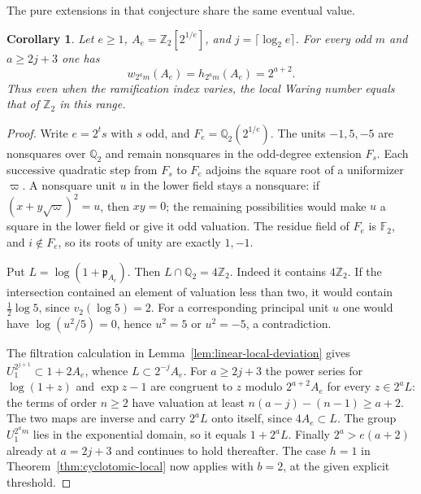 \documentclass[11pt,letterpaper]{article}
\newtheorem{corollary}[corollary]{Corollary}
\theoremstyle{definition}
\numberwithin{equation}{section}
\begin{document}
The pure extensions in that conjecture share the same eventual value.
\begin{corollary}\label{cor:pure-dyadic-width}
Let $e\ge1$, $A_e=\mathbb Z_2[2^{1/e}]$, and $j=\lceil\log_2 e\rceil$.
For every odd $m$ and $a\ge2j+3$ one has
\[
          w_{2^a m}(A_e)=h_{2^a m}(A_e)=2^{a+2}.
\]
Thus even when the ramification index varies, the local Waring number
equals that of $\mathbb Z_2$ in this range.
\end{corollary}
\begin{proof}
Write $e=2^t s$ with $s$ odd, and $F_e=\mathbb Q_2(2^{1/e})$.
The units $-1,5,-5$ are nonsquares over $\mathbb Q_2$ and remain
nonsquares in the odd-degree extension $F_s$. Each successive
quadratic step from $F_s$ to $F_e$ adjoins the square root of a
uniformizer $\varpi$. A nonsquare unit $u$ in the lower field stays
a nonsquare: if $(x+y\sqrt\varpi)^2=u$, then $xy=0$; the remaining
possibilities would make $u$ a square in the lower field or give
it odd valuation. The residue field of $F_e$ is $\mathbb F_2$, and
$i\notin F_e$, so its roots of unity are exactly $1,-1$.

Put $L=\log(1+\mathfrak p_{A_e})$. Then
$L\cap\mathbb Q_2=4\mathbb Z_2$. Indeed it contains $4\mathbb Z_2$.
If the intersection contained an element of valuation less than
two, it would contain $\frac12\log 5$, since $v_2(\log 5)=2$.
For a corresponding principal unit $u$ one would have
$\log(u^2/5)=0$, hence $u^2=5$ or $u^2=-5$, a contradiction.

The filtration calculation in Lemma~\ref{lem:linear-local-deviation}
gives $U_1^{2^{j+1}}\subset1+2A_e$, whence $L\subset2^{-j}A_e$.
For $a\ge2j+3$ the power series for $\log(1+z)$ and
$\exp z-1$ are congruent to $z$ modulo $2^{a+2}A_e$ for every
$z\in2^a L$: the terms of order $n\ge2$ have valuation at least
$n(a-j)-(n-1)\ge a+2$. The two maps are inverse and carry
$2^a L$ onto itself, since $4A_e\subset L$. The group $U_1^{2^am}$
lies in the exponential domain, so it equals $1+2^aL$.
Finally $2^a>e(a+2)$ already at $a=2j+3$ and continues to hold
thereafter. The case $h=1$ in Theorem~\ref{thm:cyclotomic-local}
now applies with $b=2$, at the given explicit threshold.
\end{proof}
\end{document}
